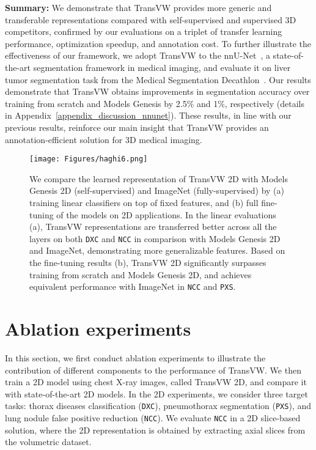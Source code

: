 \documentclass[journal,twoside,web]{ieeecolor}
\begin{document}
\smallskip
\noindent\textbf{Summary:} We demonstrate that TransVW  provides more generic and transferable representations compared with self-supervised and supervised 3D competitors, confirmed by  our  evaluations on a triplet of transfer learning performance, optimization speedup, and annotation cost. 
To further illustrate the effectiveness of our framework, we adopt TransVW to the nnU-Net~\cite{isensee2020automated},  a state-of-the-art segmentation framework in  medical  imaging, and evaluate  it  on  liver  tumor  segmentation  task from the Medical Segmentation Decathlon~\cite{Amber2019large}. Our results demonstrate that TransVW obtains improvements in segmentation accuracy over training from scratch and Models Genesis by 2.5\% and 1\%,  respectively (details in Appendix~\ref{appendix_discussion_nnunet}). These results, in line with our previous results, reinforce our main insight that TransVW provides an annotation-efficient solution for 3D medical imaging.

 \begin{figure*}[t]
\centerline{\texttt{[image: Figures/haghi6.png]}}
\caption{We compare the learned representation of TransVW 2D with Models Genesis 2D (self-supervised) and ImageNet (fully-supervised) by (a) training linear classifiers on top of fixed features, and (b) full fine-tuning of the models on 2D applications. In the linear evaluations (a), TransVW representations are transferred better across all the layers on both \texttt{DXC} and \texttt{NCC} in comparison with Models Genesis 2D and ImageNet, demonstrating more generalizable features. Based on the fine-tuning results (b), TransVW 2D significantly surpasses training from scratch and Models Genesis 2D, and achieves equivalent performance with ImageNet in \texttt{NCC} and \texttt{PXS}.   }
\label{fig:2d_linear_and_finetuning}
\end{figure*}

\section{Ablation experiments}
In this section, we first conduct ablation experiments to illustrate the contribution of different components to the performance of TransVW. We then train a 2D model using chest X-ray images, called TransVW 2D, and compare it with state-of-the-art 2D models. In the 2D experiments, we consider three target tasks: thorax diseases classification (\texttt{DXC}), pneumothorax segmentation (\texttt{PXS}), and lung nodule false positive reduction (\texttt{NCC}). We evaluate \texttt{NCC} in a 2D slice-based solution, where the 2D representation is obtained by extracting axial slices from the volumetric dataset.
\end{document}
